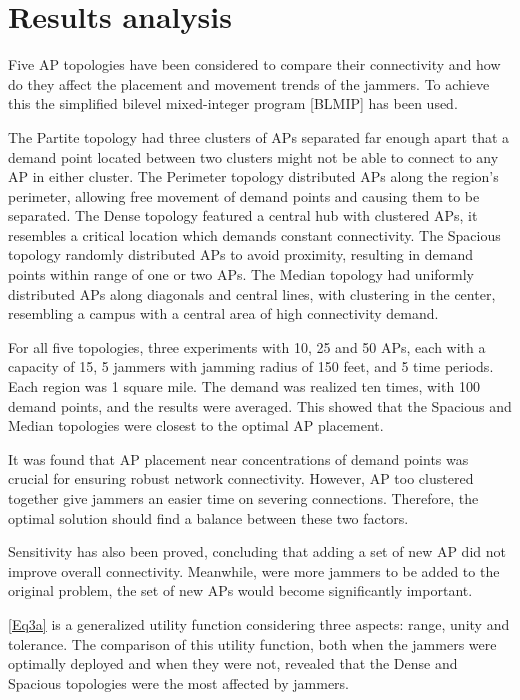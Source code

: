 \documentclass[runningheads]{llncs}
\begin{document}
\section{Results analysis}
	
	Five AP topologies have been considered to compare their connectivity and how do they affect the placement and movement trends of the jammers. To achieve this the simplified bilevel mixed-integer program [BLMIP] has been used.

	The Partite topology had three clusters of APs separated far enough apart that a demand point located between two clusters might not be able to connect to any AP in either cluster. The Perimeter topology distributed APs along the region's perimeter, allowing free movement of demand points and causing them to be separated. The Dense topology featured a central hub with clustered APs, it resembles a critical location which demands constant connectivity. The Spacious topology randomly distributed APs to avoid proximity, resulting in demand points within range of one or two APs. The Median topology had uniformly distributed APs along diagonals and central lines, with clustering in the center, resembling a campus with a central area of high connectivity demand.
	

	For all five topologies, three experiments with 10, 25 and 50 APs, each with a capacity of 15, 5 jammers with jamming radius of 150 feet, and 5 time periods. Each region was 1 square mile. The demand was realized ten times, with 100 demand points, and the results were averaged. This showed that the Spacious and Median topologies were closest to the optimal AP placement.
	
	It was found that AP placement near concentrations of demand points was crucial for ensuring robust network connectivity. However, AP too clustered together give jammers an easier time on severing connections. Therefore, the optimal solution should find a balance between these two factors. 
	
	Sensitivity has also been proved, concluding that adding a set of new AP did not improve overall connectivity. Meanwhile, were more jammers to be added to the original problem, the set of new APs would become significantly important.
	
	\ref{Eq3a} is a generalized utility function considering three aspects: range, unity and tolerance.
	 The comparison of this utility function, both when the jammers were optimally deployed and when they were not, revealed that the Dense and Spacious topologies were the most affected by jammers.
	
\end{document}
